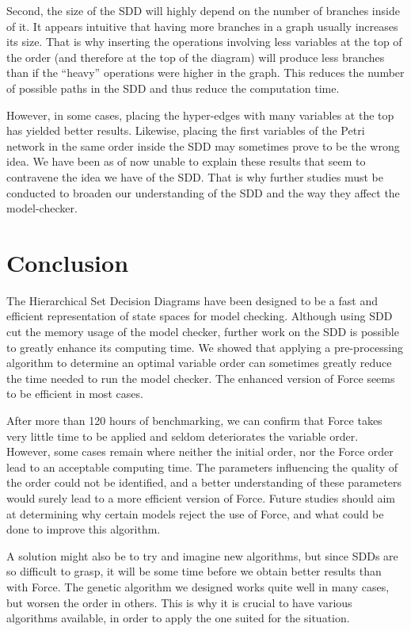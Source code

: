 \documentclass[12pt]{report}
\begin{document}
Second, the size of the SDD will highly depend on the number of branches inside of it. It appears intuitive that having more branches in a graph usually increases its size. That is why inserting the operations involving less variables at the top of the order (and therefore at the top of the diagram) will produce less branches than if the \enquote{heavy} operations were higher in the graph. This reduces the number of possible paths in the SDD and thus reduce the computation time.

However, in some cases, placing the hyper-edges with many variables at the top has yielded better results. Likewise, placing the first variables of the Petri network in the same order inside the SDD may sometimes prove to be the wrong idea. We have been as of now unable to explain these results that seem to contravene the idea we have of the SDD. That is why further studies must be conducted to broaden our understanding of the SDD and the way they affect the model-checker. 

\newpage
\section*{Conclusion}

The Hierarchical Set Decision Diagrams have been designed to be a fast and efficient representation of state spaces for model checking. Although using SDD cut the memory usage of the model checker, further work on the SDD is possible to greatly enhance its computing time. We showed that applying a pre-processing algorithm to determine an optimal variable order can sometimes greatly reduce the time needed to run the model checker. The enhanced version of Force seems to be efficient in most cases.

After more than 120 hours of benchmarking, we can confirm that Force takes very little time to be applied and seldom deteriorates the variable order. However, some cases remain where neither the initial order, nor the Force order lead to an acceptable computing time. The parameters influencing the quality of the order could not be identified, and a better understanding of these parameters would surely lead to a more efficient version of Force. Future studies should aim at determining why certain models reject the use of Force, and what could be done to improve this algorithm.

A solution might also be to try and imagine new algorithms, but since SDDs are so difficult to grasp, it will be some time before we obtain better results than with Force. The genetic algorithm we designed works quite well in many cases, but worsen the order in others. This is why it is crucial to have various algorithms available, in order to apply the one suited for the situation.
\end{document}
